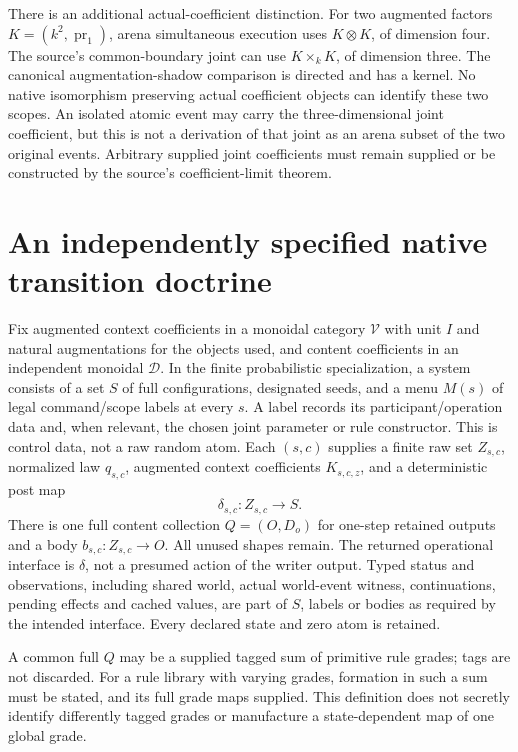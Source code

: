\documentclass[11pt]{article}
\begin{document}
There is an additional actual-coefficient distinction. For two augmented factors $K=(k^2,\operatorname{pr}_1)$, arena simultaneous execution uses $K\otimes K$, of dimension four. The source's common-boundary joint can use $K\times_kK$, of dimension three. The canonical augmentation-shadow comparison is directed and has a kernel. No native isomorphism preserving actual coefficient objects can identify these two scopes. An isolated atomic event may carry the three-dimensional joint coefficient, but this is not a derivation of that joint as an arena subset of the two original events. Arbitrary supplied joint coefficients must remain supplied or be constructed by the source's coefficient-limit theorem.

\section{An independently specified native transition doctrine}
\begin{definition}
Fix augmented context coefficients in a monoidal category $\mathcal V$ with unit $I$ and natural augmentations for the objects used, and content coefficients in an independent monoidal $\mathcal D$. In the finite probabilistic specialization, a system consists of a set $S$ of full configurations, designated seeds, and a menu $M(s)$ of legal command/scope labels at every $s$. A label records its participant/operation data and, when relevant, the chosen joint parameter or rule constructor. This is control data, not a raw random atom. Each $(s,c)$ supplies a finite raw set $Z_{s,c}$, normalized law $q_{s,c}$, augmented context coefficients $K_{s,c,z}$, and a deterministic post map
\[
 \delta_{s,c}:Z_{s,c}\longrightarrow S.
\]
There is one full content collection $Q=(O,D_o)$ for one-step retained outputs and a body $b_{s,c}:Z_{s,c}\to O$. All unused shapes remain. The returned operational interface is $\delta$, not a presumed action of the writer output. Typed status and observations, including shared world, actual world-event witness, continuations, pending effects and cached values, are part of $S$, labels or bodies as required by the intended interface. Every declared state and zero atom is retained.
\end{definition}
A common full $Q$ may be a supplied tagged sum of primitive rule grades; tags are not discarded. For a rule library with varying grades, formation in such a sum must be stated, and its full grade maps supplied. This definition does not secretly identify differently tagged grades or manufacture a state-dependent map of one global grade.
\end{document}
